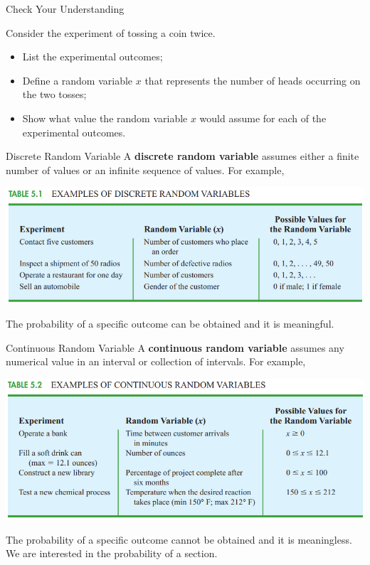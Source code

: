 \documentclass{beamer}
\begin{document}
\begin{frame}{Check Your Understanding}

Consider the experiment of tossing a coin twice. 
\begin{itemize}
\item List the experimental outcomes;
\item Define a random variable $x$ that represents the number of heads occurring on the two tosses;
\item Show what value the random variable $x$ would assume for each of the experimental outcomes. 
\end{itemize}

\end{frame}

\begin{frame}{Discrete Random Variable}
A \textbf{discrete random variable} assumes either a finite number of values or an infinite sequence of values. For example, 

\begin{center}
\includegraphics[scale=0.4]{images/section4DiscreteRandomExample.png}
\end{center}

The probability of a specific outcome can be obtained and it is meaningful. 

\end{frame}



\begin{frame}{Continuous Random Variable}
A \textbf{continuous random variable} assumes any numerical value in an interval or collection of intervals. For example, 
\begin{center}
\includegraphics[scale=0.4]{images/section4ContinuousRandomExample.png}
\end{center}

The probability of a specific outcome cannot be obtained and it is meaningless. We are interested in the probability of a section. 

\end{frame}
\end{document}
